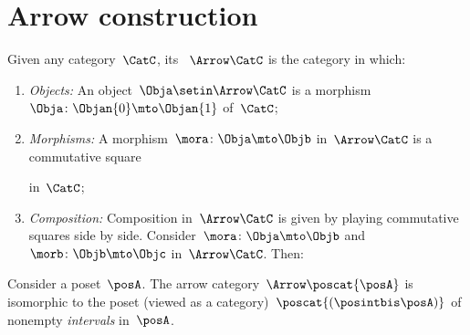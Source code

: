 
\section{Arrow construction}


\begin{ctdefinition}
    \label{def:arrow_category}
    Given any category~$\CatC$, its \emph{}~$\Arrow\CatC$ is the category in which:
    \begin{enumerate}
        \item \emph{Objects:} An object~$\Obja \setin \Arrow\CatC$ is a morphism~$\Obja\colon \Objan{0}\mto \Objan{1}$ of~$\CatC$;
        \item \emph{Morphisms:} A morphism~$\mora\colon \Obja \mto \Objb$ in~$\Arrow\CatC$ is a commutative square
              \begin{center}
              \end{center}
              in~$\CatC$;
        \item \emph{Composition:} Composition in~$\Arrow \CatC$ is given by playing commutative squares side by side.
              Consider~$\mora\colon \Obja \mto \Objb$ and~$\morb\colon \Objb \mto \Objc$ in~$\Arrow\CatC$.
              Then:
              \begin{center}
              \end{center}
    \end{enumerate}
\end{ctdefinition}

\begin{example}[Intervals]
    \label{exa:arrow-poset}
    Consider a poset~$\posA$.
    The arrow category~$\Arrow \poscat{\posA}$ is isomorphic to the poset (viewed as a category)~$\poscat{\left(\posintbis\posA\right)}$ of nonempty \emph{intervals} in~$\posA$.
\end{example}


